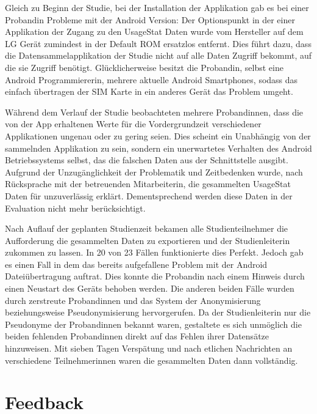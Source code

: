 Gleich zu Beginn der Studie, bei der Installation der Applikation gab es bei einer Probandin Probleme mit der Android Version:
Der Optionspunkt in der einer Applikation der Zugang zu den UsageStat Daten wurde vom Hersteller auf dem LG Gerät zumindest in der Default ROM ersatzlos entfernt.
Dies führt dazu, dass die Datensammelapplikation der Studie nicht auf alle Daten Zugriff bekommt, auf die sie Zugriff benötigt.
Glücklicherweise besitzt die Probandin, selbst eine Android Programmiererin, mehrere aktuelle Android Smartphones, sodass das einfach übertragen der SIM Karte in ein anderes Gerät das Problem umgeht.
\par
Während dem Verlauf der Studie beobachteten mehrere Probandinnen,  dass die von der App erhaltenen Werte für die Vordergrundzeit verschiedener Applikationen ungenau oder zu gering seien.
Dies scheint ein Unabhängig von der sammelnden Applikation zu sein, sondern ein unerwartetes Verhalten des Android Betriebssystems selbst, das die falschen Daten aus der Schnittstelle ausgibt.
Aufgrund der Unzugänglichkeit der Problematik und Zeitbedenken wurde, nach Rücksprache mit der betreuenden Mitarbeiterin, die gesammelten UsageStat Daten für unzuverlässig erklärt.
Dementsprechend werden diese Daten in der Evaluation nicht mehr berücksichtigt.
\par
Nach Auflauf der geplanten Studienzeit bekamen alle Studienteilnehmer die Aufforderung die gesammelten Daten zu exportieren und der Studienleiterin zukommen zu lassen. 
In 20 von 23 Fällen funktionierte dies Perfekt.
Jedoch gab es einen Fall in dem das bereits aufgefallene Problem \cite{androidbug} mit der Android Dateiübertragung auftrat.
Dies konnte die Probandin nach einem Hinweis durch einen Neustart des Geräts behoben werden.
Die anderen beiden Fälle wurden durch zerstreute Probandinnen und das System der Anonymisierung beziehungsweise Pseudonymisierung hervorgerufen.
Da der Studienleiterin nur die Pseudonyme der Probandinnen bekannt waren, gestaltete es sich unmöglich die beiden fehlenden Probandinnen direkt auf das Fehlen ihrer Datensätze hinzuweisen.
Mit sieben Tagen Verspätung und nach etlichen Nachrichten an verschiedene Teilnehmerinnen waren die gesammelten Daten dann vollständig.

\section{Feedback}

